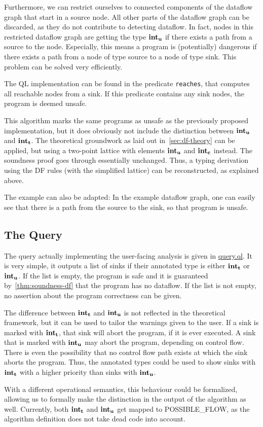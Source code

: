 Furthermore, we can restrict ourselves to connected components of the dataflow graph
that start in a source node.
All other parts of the dataflow graph can be discarded, as they do not contribute 
to detecting dataflow.
In fact, nodes in this restricted dataflow graph are getting the type $\textbf{int}_\textbf{u}$ if there
exists a path from a source to the node.
Especially, this means a program is (potentially) dangerous if there exists a path
from a node of type source to a node of type sink.
This problem can be solved very efficiently.

The QL implementation can be found in the predicate \texttt{reaches},
that computes all reachable nodes from a sink.
If this predicate contains any sink nodes, the program is deemed unsafe.

This algorithm marks the same programs as unsafe as the previously proposed implementation,
but it does obviously not include the distinction between $\textbf{int}_\textbf{u}$ and $\textbf{int}_\textbf{t}$.
The theoretical groundwork as laid out in~\autoref{sec:df-theory} can be applied,
but using a two-point lattice with elements $\textbf{int}_\textbf{u}$ and $\textbf{int}_\textbf{c}$ instead.
The soundness proof goes through essentially unchanged.
Thus, a typing derivation using the DF rules (with the simplified lattice) 
can be reconstructed, as explained above.

The example can also be adapted: In the example dataflow graph, one can easily
see that there is a path from the source to the sink, so that program is unsafe.

\subsection{The Query}
The query actually implementing the user-facing analysis is given in \hyperref[lst:query]{query.ql}.
It is very simple, it outputs a list of sinks if their annotated type is 
either $\textbf{int}_\textbf{t}$ or $\textbf{int}_\textbf{u}$.
If the list is empty, the program is safe and it is guaranteed by~\autoref{thm:soundness-df}
that the program has no dataflow.
If the list is not empty, no assertion about the program correctness can be given.

The difference between $\textbf{int}_\textbf{t}$ and $\textbf{int}_\textbf{u}$ is not reflected in the theoretical framework,
but it can be used to tailor the warnings given to the user.
If a sink is marked with $\textbf{int}_\textbf{t}$, that sink will abort the program, if it is ever
executed.
A sink that is marked with $\textbf{int}_\textbf{u}$ may abort the program, depending on control flow.
There is even the possibility that no control flow path exists at which the sink aborts 
the program.
Thus, the annotated types could be used to show sinks with $\textbf{int}_\textbf{t}$ with a higher
priority than sinks with $\textbf{int}_\textbf{u}$.

With a different operational semantics, this behaviour could be formalized, allowing us to
formally make the distinction in the output of the algorithm as well.
Currently, both $\textbf{int}_\textbf{t}$ and $\textbf{int}_\textbf{u}$ get mapped to POSSIBLE\_FLOW,
as the algorithm definition does not take dead code into account.

